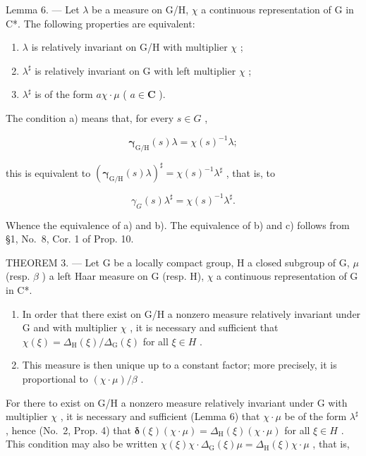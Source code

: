 Lemma 6. --- Let \(\lambda\) be a measure on G/H, \(\chi\) a continuous representation of G in C*. The following properties are equivalent:

\begin{enumerate}
\def\labelenumi{\alph{enumi})}
\item
  \(\lambda\) is relatively invariant on G/H with multiplier \(\chi\) ;
\item
  \(\lambda^{\sharp}\) is relatively invariant on G with left multiplier \(\chi\) ;
\item
  \(\lambda^{\sharp}\) is of the form \(a\chi \cdot \mu\) ( \(a \in \mathbf{C}\) ).
\end{enumerate}

The condition a) means that, for every \(s \in G\) ,

\[
\pmb {\gamma} _ {\mathrm{G/H}} (s) \lambda = \chi (s) ^ {- 1} \lambda ;
\]

this is equivalent to \(\left(\pmb{\gamma}_{\mathrm{G / H}}(s)\lambda\right)^{\sharp} = \chi (s)^{-1}\lambda^{\sharp}\) , that is, to

\[
\gamma_ {G} (s) \lambda^ {\sharp} = \chi (s) ^ {- 1} \lambda^ {\sharp}.
\]

Whence the equivalence of a) and b). The equivalence of b) and c) follows from §1, No.~8, Cor. 1 of Prop. 10.

THEOREM 3. --- Let G be a locally compact group, H a closed subgroup of G, \(\mu\) (resp. \(\beta\) ) a left Haar measure on G (resp. H), \(\chi\) a continuous representation of G in C*.

\begin{enumerate}
\def\labelenumi{\alph{enumi})}
\item
  In order that there exist on G/H a nonzero measure relatively invariant under G and with multiplier \(\chi\) , it is necessary and sufficient that \(\chi(\xi)=\Delta_{\mathrm{H}}(\xi)/\Delta_{\mathrm{G}}(\xi)\) for all \(\xi\in H\) .
\item
  This measure is then unique up to a constant factor; more precisely, it is proportional to \((\chi \cdot \mu) / \beta\) .
\end{enumerate}

For there to exist on G/H a nonzero measure relatively invariant under G with multiplier \(\chi\) , it is necessary and sufficient (Lemma 6) that \(\chi\cdot\mu\) be of the form \(\lambda^{\sharp}\) , hence (No.~2, Prop. 4) that \(\boldsymbol{\delta}(\xi)(\chi\cdot\mu)=\Delta_{\mathrm{H}}(\xi)(\chi\cdot\mu)\) for all \(\xi\in H\) . This condition may also be written \(\chi(\xi)\chi\cdot\Delta_{\mathrm{G}}(\xi)\mu=\Delta_{\mathrm{H}}(\xi)\chi\cdot\mu\) , that is,

